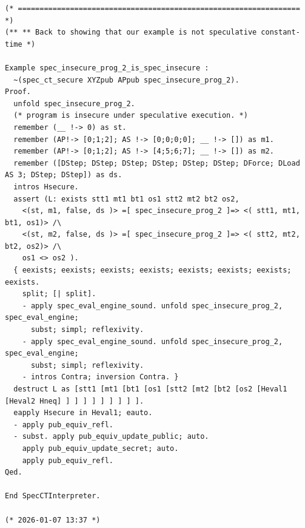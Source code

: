 \documentclass[12pt]{report}
\begin{document}
\begin{verbatim}
(* ================================================================= *)
(** ** Back to showing that our example is not speculative constant-time *)

Example spec_insecure_prog_2_is_spec_insecure :
  ~(spec_ct_secure XYZpub APpub spec_insecure_prog_2).
Proof.
  unfold spec_insecure_prog_2.
  (* program is insecure under speculative execution. *)
  remember (__ !-> 0) as st.
  remember (AP!-> [0;1;2]; AS !-> [0;0;0;0]; __ !-> []) as m1.
  remember (AP!-> [0;1;2]; AS !-> [4;5;6;7]; __ !-> []) as m2.
  remember ([DStep; DStep; DStep; DStep; DStep; DStep; DForce; DLoad AS 3; DStep; DStep]) as ds.
  intros Hsecure.
  assert (L: exists stt1 mt1 bt1 os1 stt2 mt2 bt2 os2,
    <(st, m1, false, ds )> =[ spec_insecure_prog_2 ]=> <( stt1, mt1, bt1, os1)> /\
    <(st, m2, false, ds )> =[ spec_insecure_prog_2 ]=> <( stt2, mt2, bt2, os2)> /\
    os1 <> os2 ).
  { eexists; eexists; eexists; eexists; eexists; eexists; eexists; eexists.
    split; [| split].
    - apply spec_eval_engine_sound. unfold spec_insecure_prog_2, spec_eval_engine;
      subst; simpl; reflexivity.
    - apply spec_eval_engine_sound. unfold spec_insecure_prog_2, spec_eval_engine;
      subst; simpl; reflexivity.
    - intros Contra; inversion Contra. }
  destruct L as [stt1 [mt1 [bt1 [os1 [stt2 [mt2 [bt2 [os2 [Heval1 [Heval2 Hneq] ] ] ] ] ] ] ] ] ].
  eapply Hsecure in Heval1; eauto.
  - apply pub_equiv_refl.
  - subst. apply pub_equiv_update_public; auto.
    apply pub_equiv_update_secret; auto.
    apply pub_equiv_refl.
Qed.

End SpecCTInterpreter.

(* 2026-01-07 13:37 *)
\end{verbatim}
\begin{coqdoccode}
\end{coqdoccode}
\end{document}
